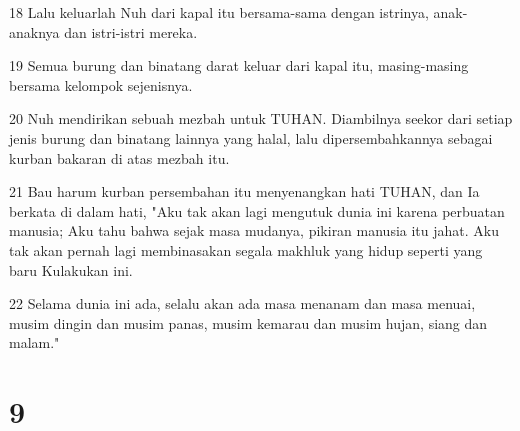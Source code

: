 \par 18 Lalu keluarlah Nuh dari kapal itu bersama-sama dengan istrinya, anak-anaknya dan istri-istri mereka.
\par 19 Semua burung dan binatang darat keluar dari kapal itu, masing-masing bersama kelompok sejenisnya.
\par 20 Nuh mendirikan sebuah mezbah untuk TUHAN. Diambilnya seekor dari setiap jenis burung dan binatang lainnya yang halal, lalu dipersembahkannya sebagai kurban bakaran di atas mezbah itu.
\par 21 Bau harum kurban persembahan itu menyenangkan hati TUHAN, dan Ia berkata di dalam hati, "Aku tak akan lagi mengutuk dunia ini karena perbuatan manusia; Aku tahu bahwa sejak masa mudanya, pikiran manusia itu jahat. Aku tak akan pernah lagi membinasakan segala makhluk yang hidup seperti yang baru Kulakukan ini.
\par 22 Selama dunia ini ada, selalu akan ada masa menanam dan masa menuai, musim dingin dan musim panas, musim kemarau dan musim hujan, siang dan malam."

\chapter{9}

